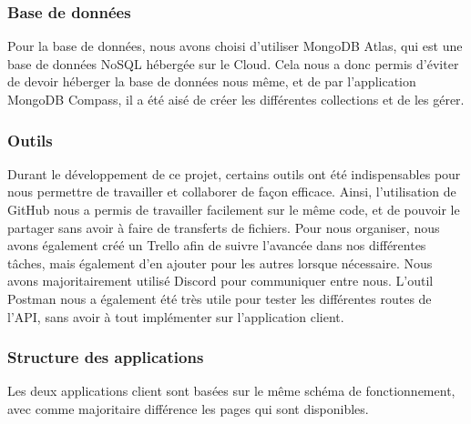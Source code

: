 \documentclass[../rapport.tex]{subfiles}
\begin{document}
\subsubsection{Base de données}
Pour la base de données, nous avons choisi d'utiliser MongoDB Atlas, qui est une base de données NoSQL hébergée sur le Cloud. Cela nous a donc permis d'éviter de devoir héberger la base de données nous même, et de par l'application MongoDB Compass, il a été aisé de créer les différentes collections et de les gérer. 

\subsubsection{Outils}
Durant le développement de ce projet, certains outils ont été indispensables pour nous permettre de travailler et collaborer de façon efficace. Ainsi, l'utilisation de GitHub nous a permis de travailler facilement sur le même code, et de pouvoir le partager sans avoir à faire de transferts de fichiers. Pour nous organiser, nous avons également créé un Trello afin de suivre l'avancée dans nos différentes tâches, mais également d'en ajouter pour les autres lorsque nécessaire. Nous avons majoritairement utilisé Discord pour communiquer entre nous. L'outil Postman nous a également été très utile pour tester les différentes routes de l'API, sans avoir à tout implémenter sur l'application client.

\subsubsection{Structure des applications}
Les deux applications client sont basées sur le même schéma de fonctionnement, avec comme majoritaire différence les pages qui sont disponibles. 
\end{document}
